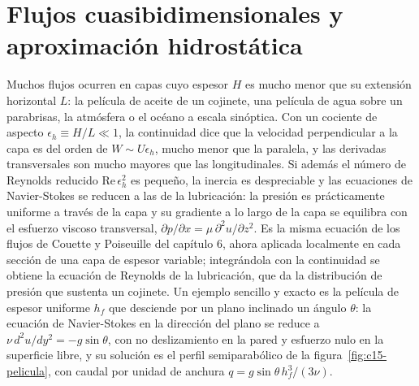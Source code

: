 \documentclass[10pt,openany]{book}
\begin{document}
\section{Flujos cuasibidimensionales y aproximación hidrostática}

Muchos flujos ocurren en capas cuyo espesor \(H\) es mucho menor que su extensión horizontal \(L\): la película de aceite de un cojinete, una película de agua sobre un parabrisas, la atmósfera o el océano a escala sinóptica. Con un cociente de aspecto \(\epsilon_h \equiv H/L \ll 1\), la continuidad dice que la velocidad perpendicular a la capa es del orden de \(W \sim U\epsilon_h\), mucho menor que la paralela, y las derivadas transversales son mucho mayores que las longitudinales. Si además el número de Reynolds reducido \(\mathrm{Re}\,\epsilon_h^{2}\) es pequeño, la inercia es despreciable y las ecuaciones de Navier-Stokes se reducen a las de la lubricación: la presión es prácticamente uniforme a través de la capa y su gradiente a lo largo de la capa se equilibra con el esfuerzo viscoso transversal, \(\partial p/\partial x = \mu\,\partial^{2}u/\partial z^{2}\). Es la misma ecuación de los flujos de Couette y Poiseuille del capítulo 6, ahora aplicada localmente en cada sección de una capa de espesor variable; integrándola con la continuidad se obtiene la ecuación de Reynolds de la lubricación, que da la distribución de presión que sustenta un cojinete. Un ejemplo sencillo y exacto es la película de espesor uniforme \(h_f\) que desciende por un plano inclinado un ángulo \(\theta\): la ecuación de Navier-Stokes en la dirección del plano se reduce a \(\nu\,d^{2}u/dy^{2} = -g\sin\theta\), con no deslizamiento en la pared y esfuerzo nulo en la superficie libre, y su solución es el perfil semiparabólico de la figura~\ref{fig:c15-pelicula}, con caudal por unidad de anchura \(q = g\sin\theta\,h_f^{3}/(3\nu)\).
\end{document}
